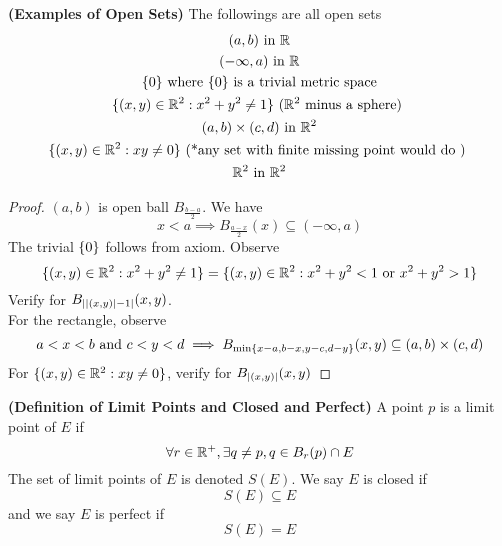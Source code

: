 \documentclass{report}
\begin{document}
\begin{theorem}
\label{2.7.9}
\textbf{(Examples of Open Sets)} The followings are all open sets
\begin{gather}
   (a,b)\text{ in }\mathbb{R}\\
   (-\infty , a)\text{ in }\mathbb{R}\\
   \{ 0 \}\text{ where $\{ 0 \}$ is a trivial metric space}\\
   \{ (x,y)\in\mathbb{R}^2: x^2+y^2\neq 1 \}\text{ ($\mathbb{R}^2$ minus a sphere) }\\
   (a,b)\times (c,d)\text{ in }\mathbb{R}^2\\
   \{ (x,y)\in\mathbb{R}^2 : xy\neq 0 \}\text{ (*any set with finite missing point would do ) }\\
   \mathbb{R}^2 \text{ in } \mathbb{R}^2
\end{gather}
\end{theorem}
\begin{proof}
$(a,b)$ is open ball $B_{\frac{b-a}{2}}$. We have 
\begin{equation}
x<a \implies B_{\frac{a-x}{2}}(x)\subseteq (-\infty, a)
\end{equation}
The trivial $\{ 0 \}$ follows from axiom. Observe
\begin{equation}
\{ (x,y)\in\mathbb{R}^2: x^2+y^2\neq 1 \}=\{ (x,y)\in\mathbb{R}^2:x^2+y^2<1\text{ or }x^2+y^2>1 \}
\end{equation}
Verify for $B_{||(x,y)|-1|}(x,y)$.\\

For the rectangle, observe 
\begin{equation}
a<x<b\text{ and }c<y<d\implies B_{\min \{ x-a,b-x,y-c,d-y \}}(x,y)\subseteq (a,b)\times (c,d)
\end{equation}
For $\{ (x,y)\in\mathbb{R}^2:xy\neq 0 \}$, verify for $B_{|(x,y)|}(x,y)$
\end{proof}
\begin{definition}
\label{2.7.10}
\textbf{(Definition of Limit Points and Closed and Perfect)} A point $p$ is a limit point of $E$ if 
 \begin{equation}
\forall r\in\mathbb{R}^+, \exists q\neq p, q\in B_r(p) \cap E
\end{equation}
The set of limit points of  $E$ is denoted $S(E)$. We say $E$ is closed if 
\begin{equation}
S(E)\subseteq E
\end{equation}
and we say $E$ is perfect if 
\begin{equation}
S(E)=E
\end{equation}
\end{definition}
\end{document}
